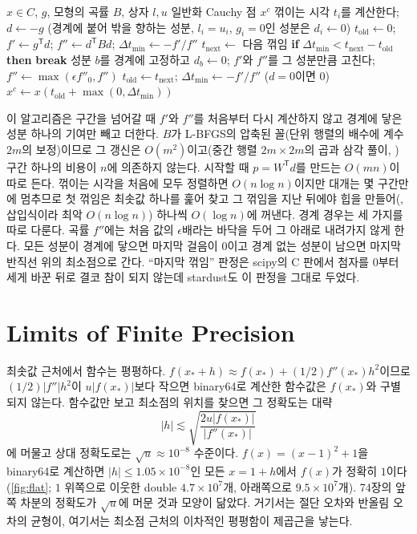 \begin{algorithm}[htbp]
\begin{algorithmic}[1]
\Require $x\in C$, $g$, 모형의 곡률 $B$, 상자 $l,u$
\Ensure 일반화 Cauchy 점 $x^c$
\State 꺾이는 시각 $t_i$를 계산한다; $d\gets-g$ (경계에 붙어 밖을 향하는 성분, $l_i=u_i$, $g_i=0$인 성분은 $d_i\gets0$)
\State $t_{\mathrm{old}}\gets0$; $f'\gets g^{\mathsf T}d$; $f''\gets d^{\mathsf T}Bd$; $\Delta t_{\min}\gets-f'/f''$ 
  \State $t_{\mathrm{next}}\gets$ 다음 꺾임 
  \State \textbf{if} $\Delta t_{\min}<t_{\mathrm{next}}-t_{\mathrm{old}}$ \textbf{then} \textbf{break} 
  \State 성분 $b$를 경계에 고정하고 $d_b\gets0$; $f'$와 $f''$를 그 성분만큼 고친다; $f''\gets\max(\epsilon f''_0,f'')$
  \State $t_{\mathrm{old}}\gets t_{\mathrm{next}}$; $\Delta t_{\min}\gets-f'/f''$ ($d=0$이면 $0$) 
\EndWhile
\State $x^c\gets x(t_{\mathrm{old}}+\max(0,\Delta t_{\min}))$
\end{algorithmic}
\caption{사영 경로 위의 일반화 Cauchy 점 (stardust 의 , 힙은 )}
\label{alg:cauchy}
\end{algorithm}

이 알고리즘은 구간을 넘어갈 때 $f'$와 $f''$를 처음부터 다시 계산하지 않고 경계에 닿은 성분 하나의 기여만 빼고 더한다. $B$가 L-BFGS의 압축된 꼴(단위 행렬의 배수에 계수 $2m$의 보정)이므로 그 갱신은 $O(m^2)$이고(중간 행렬 $2m\times2m$의 곱과 삼각 풀이, ) 구간 하나의 비용이 $n$에 의존하지 않는다. 시작할 때 $p=W^{\mathsf T}d$를 만드는 $O(mn)$이 따로 든다. 꺾이는 시각을 처음에 모두 정렬하면 $O(n\log n)$이지만 대개는 몇 구간만에 멈추므로 첫 꺾임은 최솟값 하나를 훑어 찾고 그 꺾임을 지난 뒤에야 힙을 만들어(, 삽입식이라 최악 $O(n\log n)$) 하나씩 $O(\log n)$에 꺼낸다. 경계 경우는 세 가지를 따로 다룬다. 곡률 $f''$에는 처음 값의 $\epsilon$배라는 바닥을 두어 그 아래로 내려가지 않게 한다. 모든 성분이 경계에 닿으면 마지막 걸음이 $0$이고 경계 없는 성분이 남으면 마지막 반직선 위의 최소점으로 간다. ``마지막 꺾임'' 판정은 scipy의 C 판에서 첨자를 $0$부터 세게 바꾼 뒤로 결코 참이 되지 않는데 stardust도 이 판정을 그대로 두었다.

\section{Limits of Finite Precision}
\label{sec:opt-precision}

최솟값 근처에서 함수는 평평하다. $f(x_\ast+h)\approx f(x_\ast)+(1/2)f''(x_\ast)h^2$이므로 $(1/2)|f''|h^2$이 $u|f(x_\ast)|$보다 작으면 binary64로 계산한 함수값은 $f(x_\ast)$와 구별되지 않는다. 함수값만 보고 최소점의 위치를 찾으면 그 정확도는 대략
\[
|h|\lesssim\sqrt{\frac{2u|f(x_\ast)|}{|f''(x_\ast)|}}
\]
에 머물고 상대 정확도로는 $\sqrt u\approx10^{-8}$ 수준이다. $f(x)=(x-1)^2+1$을 binary64로 계산하면 $|h|\le1.05\times10^{-8}$인 모든 $x=1+h$에서 $f(x)$가 정확히 $1$이다(\cref{fig:flat}; $1$ 위쪽으로 이웃한 double $4.7\times10^7$개, 아래쪽으로 $9.5\times10^7$개). 74장의 앞쪽 차분의 정확도가 $\sqrt u$에 머문 것과 모양이 닮았다. 거기서는 절단 오차와 반올림 오차의 균형이, 여기서는 최소점 근처의 이차적인 평평함이 제곱근을 낳는다.

